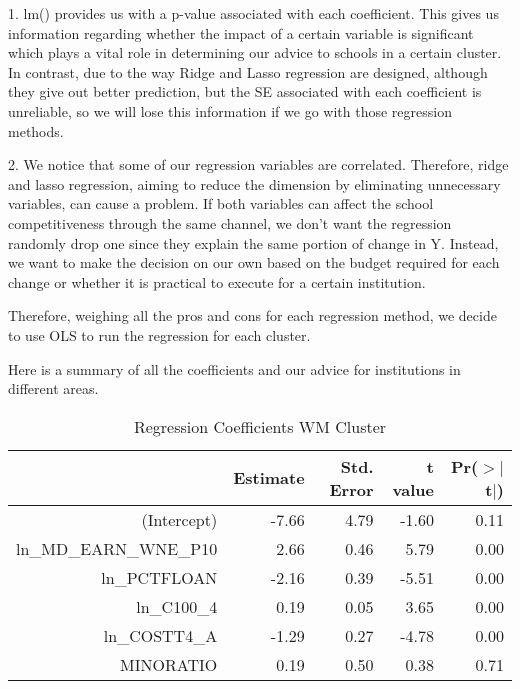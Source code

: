\documentclass{article}
\begin{document}
1. lm() provides us with a p-value associated with each coefficient. This gives us information regarding whether the impact of a certain variable is significant which plays a vital role in determining our advice to schools in a certain cluster. In contrast, due to the way Ridge and Lasso regression are designed, although they give out better prediction, but the SE associated with each coefficient is unreliable, so we will lose this information if we go with those regression methods.

2. We notice that some of our regression variables are correlated. Therefore, ridge and lasso regression, aiming to reduce the dimension by eliminating unnecessary variables, can cause a problem. If both variables can affect the school competitiveness through the same channel, we don't want the regression randomly drop one since they explain the same portion of change in Y. Instead, we want to make the decision on our own based on the budget required for each change or whether it is practical to execute for a certain institution.

Therefore, weighing all the pros and cons for each regression method, we decide to use OLS to run the regression for each cluster.

Here is a summary of all the coefficients and our advice for institutions in different areas.

\begin{Schunk}
\begin{Soutput}
\begin{table}[H]
\centering
\begin{tabular}{rrrrr}
  \hline
 & Estimate & Std. Error & t value & Pr($>$$|$t$|$) \\ 
  \hline
(Intercept) & -7.66 & 4.79 & -1.60 & 0.11 \\ 
  ln\_MD\_EARN\_WNE\_P10 & 2.66 & 0.46 & 5.79 & 0.00 \\ 
  ln\_PCTFLOAN & -2.16 & 0.39 & -5.51 & 0.00 \\ 
  ln\_C100\_4 & 0.19 & 0.05 & 3.65 & 0.00 \\ 
  ln\_COSTT4\_A & -1.29 & 0.27 & -4.78 & 0.00 \\ 
  MINORATIO & 0.19 & 0.50 & 0.38 & 0.71 \\ 
   \hline
\end{tabular}
\caption{Regression Coefficients WM Cluster} 
\end{table}
\end{Soutput}
\end{Schunk}
\end{document}
